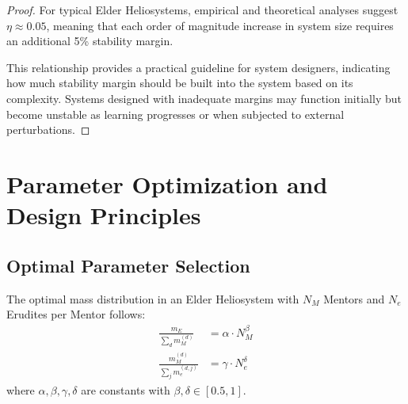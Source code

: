 \begin{proof}
For typical Elder Heliosystems, empirical and theoretical analyses suggest $\eta \approx 0.05$, meaning that each order of magnitude increase in system size requires an additional 5\% stability margin.

This relationship provides a practical guideline for system designers, indicating how much stability margin should be built into the system based on its complexity. Systems designed with inadequate margins may function initially but become unstable as learning progresses or when subjected to external perturbations.
\end{proof}

\section{Parameter Optimization and Design Principles}

\subsection{Optimal Parameter Selection}

\begin{theorem}
The optimal mass distribution in an Elder Heliosystem with $N_M$ Mentors and $N_e$ Erudites per Mentor follows:
\begin{align}
\frac{m_E}{\sum_d m_M^{(d)}} &= \alpha \cdot N_M^{\beta} \\
\frac{m_M^{(d)}}{\sum_j m_e^{(d,j)}} &= \gamma \cdot N_e^{\delta}
\end{align}
where $\alpha, \beta, \gamma, \delta$ are constants with $\beta, \delta \in [0.5, 1]$.
\end{theorem}

